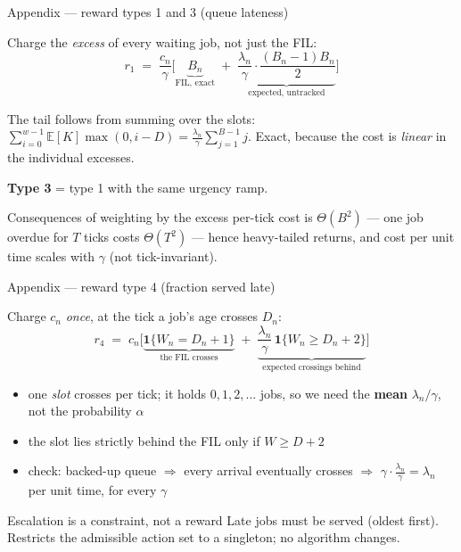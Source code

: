 \documentclass[12pt,aspectratio=169]{beamer}
\newcommand{\good}[1]{\textbf{#1}}
\begin{document}
\begin{frame}{Appendix --- reward types 1 and 3 (queue lateness)}

Charge the \emph{excess} of every waiting job, not just the FIL:
\[
  r_1 \;=\; \frac{c_n}{\gamma}\Big[\underbrace{B_n}_{\text{FIL, exact}}
  \;+\; \underbrace{\frac{\lambda_n}{\gamma}\cdot\frac{(B_n-1)B_n}{2}}_{\text{expected, untracked}}\Big]
\]

\vfill
The tail follows from summing over the slots:
$\sum_{i=0}^{w-1}\mathbb{E}[K]\max(0,i-D) = \frac{\lambda_n}{\gamma}\sum_{j=1}^{B-1} j$.
Exact, because the cost is \emph{linear} in the individual excesses.

\vfill
\textbf{Type 3} = type 1 with the same urgency ramp.

\vfill
\begin{alertblock}{Consequences of weighting by the excess}
per-tick cost is $\Theta(B^2)$ --- one job overdue for $T$ ticks costs
$\Theta(T^2)$ --- hence heavy-tailed returns, and cost per unit time scales with
$\gamma$ (not tick-invariant).
\end{alertblock}

\end{frame}

\begin{frame}{Appendix --- reward type 4 (fraction served late)}

Charge $c_n$ \emph{once}, at the tick a job's age crosses $D_n$:
\[
  r_4 \;=\; c_n\Big[\underbrace{\mathbf{1}\{W_n = D_n+1\}}_{\text{the FIL crosses}}
  \;+\; \underbrace{\frac{\lambda_n}{\gamma}\,\mathbf{1}\{W_n \ge D_n+2\}}_{\text{expected crossings behind}}\Big]
\]

\vfill
\begin{itemize}
  \item one \emph{slot} crosses per tick; it holds $0,1,2,\dots$ jobs, so we need
        the \good{mean} $\lambda_n/\gamma$, not the probability $\alpha$
  \item the slot lies strictly behind the FIL only if $W \ge D+2$
  \item check: backed-up queue $\Rightarrow$ every arrival eventually crosses
        $\Rightarrow$ $\gamma\cdot\frac{\lambda_n}{\gamma} = \lambda_n$ per unit
        time, for every $\gamma$
\end{itemize}

\vfill
\begin{block}{Escalation is a constraint, not a reward}
Late jobs must be served (oldest first).  Restricts the admissible action set to
a singleton; no algorithm changes.
\end{block}

\end{frame}
\end{document}

